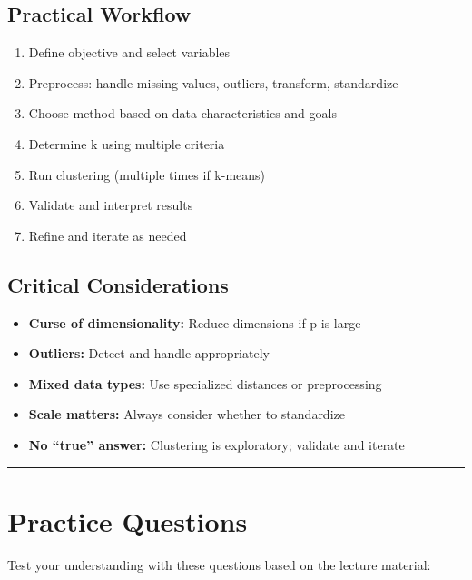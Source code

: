 \documentclass[
]{article}
\begin{document}
\textbf{ }

\subsection{Practical Workflow}

\begin{enumerate}
\item
  Define objective and select variables
\item
  Preprocess: handle missing values, outliers, transform, standardize
\item
  Choose method based on data characteristics and goals
\item
  Determine k using multiple criteria
\item
  Run clustering (multiple times if k-means)
\item
  Validate and interpret results
\item
  Refine and iterate as needed
\end{enumerate}

\textbf{ }

\subsection{Critical Considerations}

\begin{itemize}
\item
  \textbf{Curse of dimensionality:} Reduce dimensions if p is large
\item
  \textbf{Outliers:} Detect and handle appropriately
\item
  \textbf{Mixed data types:} Use specialized distances or preprocessing
\item
  \textbf{Scale matters:} Always consider whether to standardize
\item
  \textbf{No ``true'' answer:} Clustering is exploratory; validate and
  iterate
\end{itemize}

\begin{center}\rule{0.5\linewidth}{0.5pt}\end{center}

\textbf{ }

\section{Practice Questions}

Test your understanding with these questions based on the lecture
material:
\end{document}
